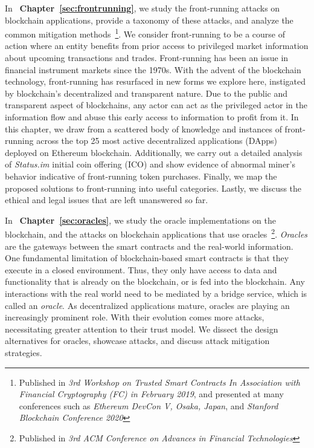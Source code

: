 In ~\textbf{Chapter~\ref{sec:frontrunning}}, we study the front-running attacks on blockchain applications, provide a taxonomy of these attacks, and analyze the common mitigation methods~\cite{eskandari2019sok}\footnote{Published in \textit{3rd Workshop on Trusted Smart Contracts In Association with Financial Cryptography (FC) in February 2019}, and presented at many conferences such as \textit{Ethereum DevCon V, Osaka, Japan}, and \textit{Stanford Blockchain Conference 2020}}. We consider front-running to be a course of action where an entity benefits from prior access to privileged market information about upcoming transactions and trades. Front-running has been an issue in financial instrument markets since the 1970s. With the advent of the blockchain technology, front-running has resurfaced in new forms we explore here, instigated by blockchain’s decentralized and transparent nature. Due to the public and transparent aspect of blockchains, any actor can act as the privileged actor in the information flow and abuse this early access to information to profit from it. In this chapter, we draw from a scattered body of knowledge and instances of front-running across the top 25 most active decentralized applications (DApps) deployed on Ethereum blockchain. Additionally, we carry out a detailed analysis of \textit{Status.im} initial coin offering (ICO) and show evidence of abnormal miner’s behavior indicative of front-running token purchases. Finally, we map the proposed solutions to front-running into useful categories. Lastly, we discuss the ethical and legal issues that are left unanswered so far.


In ~\textbf{Chapter~\ref{sec:oracles}}, we study the oracle implementations on the blockchain, and the attacks on blockchain applications that use oracles~\cite{eskandari2021sok}\footnote{Published in \textit{3rd ACM Conference on Advances in Financial Technologies}}. \textit{Oracles} are the gateways between the smart contracts and the real-world information. One fundamental limitation of blockchain-based smart contracts is that they execute in a closed environment. Thus, they only have access to data and functionality that is already on the blockchain, or is fed into the blockchain. Any interactions with the real world need to be mediated by a bridge service, which is called an \textit{oracle}. As decentralized applications mature, oracles are playing an increasingly prominent role. With their evolution comes more attacks, necessitating greater attention to their trust model. We dissect the design alternatives for oracles, showcase attacks, and discuss attack mitigation strategies.


